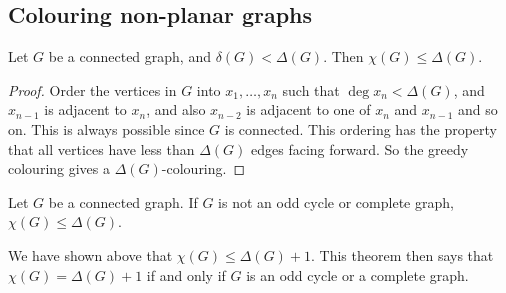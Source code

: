 \subsection{Colouring non-planar graphs}
\begin{proposition}
	Let \( G \) be a connected graph, and \( \delta(G) < \Delta(G) \).
	Then \( \chi(G) \leq \Delta(G) \).
\end{proposition}
\begin{proof}
	Order the vertices in \( G \) into \( x_1, \dots, x_n \) such that \( \deg x_n < \Delta(G) \), and \( x_{n-1} \) is adjacent to \( x_n \), and also \( x_{n-2} \) is adjacent to one of \( x_n \) and \( x_{n-1} \) and so on.
	This is always possible since \( G \) is connected.
	This ordering has the property that all vertices have less than \( \Delta(G) \) edges facing forward.
	So the greedy colouring gives a \( \Delta(G) \)-colouring.
\end{proof}
\begin{theorem}[Brooks]
	Let \( G \) be a connected graph.
	If \( G \) is not an odd cycle or complete graph, \( \chi(G) \leq \Delta(G) \).
\end{theorem}
\begin{remark}
	We have shown above that \( \chi(G) \leq \Delta(G) + 1 \).
	This theorem then says that \( \chi(G) = \Delta(G) + 1 \) if and only if \( G \) is an odd cycle or a complete graph.
\end{remark}
